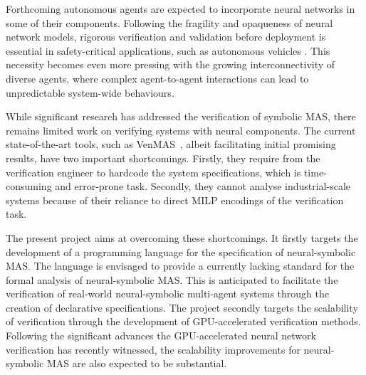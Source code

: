 \documentclass[11pt]{article}
\begin{document}

Forthcoming autonomous  agents are expected to incorporate
neural networks in some of their components. Following the
fragility and opaqueness of neural network models, rigorous
verification and validation before deployment is essential
in safety-critical applications, such as autonomous
vehicles \cite{Badue+21}. This necessity becomes even more pressing with the
growing interconnectivity of diverse agents, where complex
agent-to-agent interactions can lead to unpredictable
system-wide behaviours.

While significant research has addressed the verification of
symbolic MAS, there remains limited work on
verifying systems with neural components. The current
state-of-the-art tools,  such as {\sc
VenMAS}~\cite{Akintunde+20}, albeit facilitating initial
promising results, have two important shortcomings. Firstly,
they require from the verification engineer to  hardcode the
system specifications, which is time-consuming and
error-prone task. Secondly, they cannot analyse
industrial-scale systems because of their reliance to direct
MILP encodings of the verification task. 

The present project aims at overcoming these shortcomings.
It firstly targets the development of a programming language
for the specification of neural-symbolic MAS. The language
is envisaged to provide a currently lacking standard for the
formal analysis of neural-symbolic MAS. This is anticipated
to facilitate the verification of real-world neural-symbolic
multi-agent systems through the creation of declarative
specifications. The project secondly targets the scalability
of verification through the development of GPU-accelerated
verification methods. Following the significant advances the
GPU-accelerated neural network verification has recently
witnessed, the scalability improvements for neural-symbolic
MAS are also expected to be substantial.


  
\end{document}
